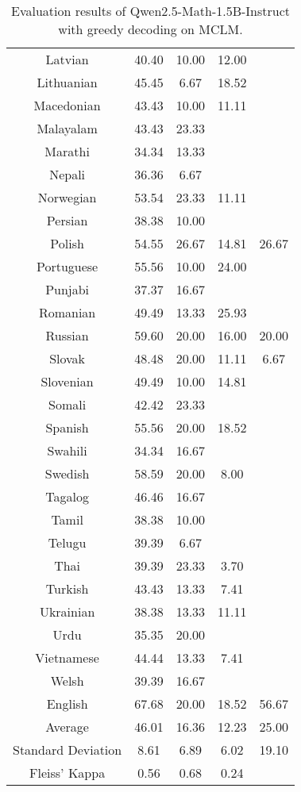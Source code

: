 \begin{table*}[]
\begin{tabular}{c|cccl}
Latvian & 40.40 & 10.00 & 12.00 &  \\
Lithuanian & 45.45 & 6.67 & 18.52 &  \\
Macedonian & 43.43 & 10.00 & 11.11 &  \\
Malayalam & 43.43 & 23.33 & \multicolumn{1}{l}{} &  \\
Marathi & 34.34 & 13.33 & \multicolumn{1}{l}{} &  \\
Nepali & 36.36 & 6.67 & \multicolumn{1}{l}{} &  \\
Norwegian & 53.54 & 23.33 & 11.11 &  \\
Persian & 38.38 & 10.00 & \multicolumn{1}{l}{} &  \\
Polish & 54.55 & 26.67 & 14.81 & \multicolumn{1}{c}{26.67} \\
Portuguese & 55.56 & 10.00 & 24.00 &  \\
Punjabi & 37.37 & 16.67 & \multicolumn{1}{l}{} &  \\
Romanian & 49.49 & 13.33 & 25.93 &  \\
Russian & 59.60 & 20.00 & 16.00 & \multicolumn{1}{c}{20.00} \\
Slovak & 48.48 & 20.00 & 11.11 & \multicolumn{1}{c}{6.67} \\
Slovenian & 49.49 & 10.00 & 14.81 &  \\
Somali & 42.42 & 23.33 & \multicolumn{1}{l}{} &  \\
Spanish & 55.56 & 20.00 & 18.52 &  \\
Swahili & 34.34 & 16.67 & \multicolumn{1}{l}{} &  \\
Swedish & 58.59 & 20.00 & 8.00 &  \\
Tagalog & 46.46 & 16.67 & \multicolumn{1}{l}{} &  \\
Tamil & 38.38 & 10.00 & \multicolumn{1}{l}{} &  \\
Telugu & 39.39 & 6.67 & \multicolumn{1}{l}{} &  \\
Thai & 39.39 & 23.33 & 3.70 &  \\
Turkish & 43.43 & 13.33 & 7.41 &  \\
Ukrainian & 38.38 & 13.33 & 11.11 &  \\
Urdu & 35.35 & 20.00 & \multicolumn{1}{l}{} &  \\
Vietnamese & 44.44 & 13.33 & 7.41 &  \\
Welsh & 39.39 & 16.67 & \multicolumn{1}{l}{} &  \\
\rowcolor[HTML]{FCE5CD}English & 67.68 & 20.00 & 18.52 & \multicolumn{1}{c}{56.67} \\ \midrule
Average & 46.01 & 16.36 & 12.23 & \multicolumn{1}{c}{25.00} \\
Standard Deviation & 8.61 & 6.89 & 6.02 & \multicolumn{1}{c}{19.10} \\
Fleiss' Kappa & 0.56 & 0.68 & 0.24 &  \\ \bottomrule
\end{tabular}
\caption{\footnotesize Evaluation results of Qwen2.5-Math-1.5B-Instruct with greedy decoding on MCLM.}
\label{tab:1_5B_greedy}
\end{table*}

